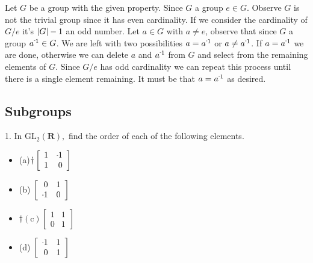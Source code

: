 \begin{mdframed}[style=darkAnswer,frametitle={Joe Starr}]
Let $G$ be a group with the given property. Since $G$ a group $e\in G$.
Observe $G$ is not the trivial group since it has even cardinality.
If we consider the cardinality of $G/e$ it's $\left\vert G\right\vert-1$ an odd number.
Let $a\in G$ with $a\neq e$, observe that since $G$ a group $\inv{a}\in G$.
We are left with two possibilities $a=\inv{a}$ or $a\neq \inv{a}$.
If $a=\inv{a}$ we are done, otherwise we can delete $a$ and $\inv{a}$ from $G$
and select from the remaining elements of $G$. Since $G/e$ has odd cardinality
we can repeat this process until there is a single element remaining. It must
be that $a=\inv{a}$ as desired.
\end{mdframed}
\newpage
\subsection{Subgroups}
\begin{mdframed}[style=darkQuesion]
1. In $\mathrm{GL}_{2}(\mathbf{R}),$ find the order of each of the following elements.
\begin{multicols}{4}
\begin{itemize}
\item[]{
    (a)$\dagger\left[\begin{array}{rr}1 & \m 1 \\
          1 & 0\end{array}\right]$}
\item[]{
    (b) $\left[\begin{array}{rr}0 & 1 \\
          \m 1 & 0\end{array}\right]$}
\item[]{
    $\dagger(\mathrm{c})\left[\begin{array}{ll}1 & 1 \\
          0 & 1\end{array}\right]$}
\item[]{
    (d) $\left[\begin{array}{rr}\m 1 & 1 \\
          0 & 1\end{array}\right]$}
\end{itemize}
\end{multicols}
\vspace{.5cm}
\end{mdframed}

